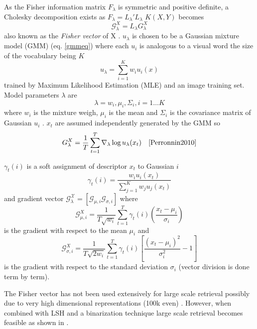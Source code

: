 \documentclass[english,12pt,a4paper,pdftex,elec,utf8, table]{aaltothesis}
\begin{document}
As the Fisher information matrix $F_\lambda$ is symmetric and positive definite, a Cholesky decomposition exists as $F_\lambda = L_\lambda'L_\lambda$ $K(X,Y)$ becomes
\begin{equation}\label{fishervectorfinal}
\mathcal{G}_\lambda^X = L_\lambda G_\lambda^X
\end{equation}
also known as the \emph{Fisher vector} of X \cite{Perronnin2010}. $u_\lambda$ is chosen to be a Gaussian mixture model (GMM) (eq. \ref{gmmeq}) where each $u_i$ is analogous to a visual word the size of the vocabulary being $K$ \cite{Perronnin2010a}
\begin{equation}\label{gmmeq}
u_\lambda = \sum_{i=1}^K w_iu_i(x)
\end{equation}
trained by Maximum Likelihood Estimation (MLE) and an image training set. Model parameters $\lambda$ are
\begin{equation}\label{lambdaparams}
\lambda = {w_i,\mu_i, \Sigma_i, i=1 \ldots K}
\end{equation}
where $w_i$ is the mixture weigh, $\mu_i$ is the mean and $\Sigma_i$ is the covariance matrix of Gaussian $u_i$ \cite{Perronnin2010}. $x_t$ are assumed independently generated by the GMM so
\begin{equation}\label{gmm}
G_\lambda^X = \frac{1}{T}\sum_{t=1}^T \nabla_\lambda \log u_\lambda(x_t) \quad \cite{Perronnin2010}
\end{equation}

$\gamma_t(i)$ is a soft assignment of descriptor $x_t$ to Gaussian $i$
\begin{equation} \label{descriptortogaussian}
\gamma_t(i) = \frac{w_iu_i(x_t)}{\sum_{j=1}^Kw_ju_j(x_t)}
\end{equation}
and gradient vector $\mathcal{G_\lambda^X} = [\mathcal{G}_{\mu,i} \mathcal{G}_{\sigma,i}] $ where
\begin{equation}\label{fishervectormu}
\mathcal{G}_{\mu,i}^X = \frac{1}{T\sqrt{w_i}} \sum^T_{t=1} \gamma_t(i)\left(\frac{x_t - \mu_i}{\sigma_i}\right)
\end{equation}
is the gradient with respect to the mean $\mu_i$ and
\begin{equation}\label{fishervectorsigma}
\mathcal{G}_{\sigma,i}^X = \frac{1}{T\sqrt{2w_i}} \sum_{t=1}^T \gamma_t(i)\left[\frac{(x_t - \mu_i)^2}{\sigma_i^2} -1\right]
  \end{equation}
is the gradient with respect to the standard deviation $\sigma_i$ (vector division is done term by term). \cite{Perronnin2010}

The Fisher vector has not been used extensively for large scale retrieval possibly due to very high dimensional representations (100k even) \cite{Perronnin2010a}. However, when combined with LSH and a binarization technique large scale retrieval becomes feasible as shown in \cite{Perronnin2010a}.
\end{document}
